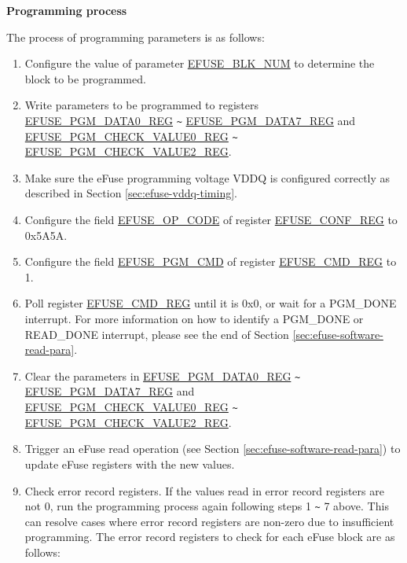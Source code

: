 \documentclass[main\_\_EN.tex]{subfiles}
\begin{document}
{\bfseries Programming process}

The process of programming parameters is as follows:

\begin{enumerate}
\item Configure the value of parameter \hyperref[fielddesc:EFUSEBLKNUM]{EFUSE\_BLK\_NUM} to determine the block to be programmed.

\item Write parameters to be programmed to registers \hyperref[regdesc:EFUSEPGMDATANREG]{EFUSE\_PGM\_DATA0\_REG} \verb+~+ \hyperref[regdesc:EFUSEPGMDATANREG]{EFUSE\_PGM\_DATA7\_REG} and  \hyperref[regdesc:EFUSEPGMCHECKVALUENREG]{EFUSE\_PGM\_CHECK\_VALUE0\_REG} \verb+~+ \hyperref[regdesc:EFUSEPGMCHECKVALUENREG]{EFUSE\_PGM\_CHECK\_VALUE2\_REG}. 

\item Make sure the eFuse programming voltage VDDQ is configured correctly as described in Section \ref{sec:efuse-vddq-timing}.

\item Configure the field \hyperref[fielddesc:EFUSEOPCODE]{EFUSE\_OP\_CODE} of register \hyperref[regdesc:EFUSECONFREG]{EFUSE\_CONF\_REG} to 0x5A5A.

\item Configure the field \hyperref[fielddesc:EFUSEPGMCMD]{EFUSE\_PGM\_CMD} of register \hyperref[regdesc:EFUSECMDREG]{EFUSE\_CMD\_REG} to 1.

\item Poll register \hyperref[regdesc:EFUSECMDREG]{EFUSE\_CMD\_REG} until it is 0x0, or wait for a PGM\_DONE interrupt. For more information on how to identify a PGM\_DONE or READ\_DONE interrupt, please see the end of Section \ref{sec:efuse-software-read-para}.

\item Clear the parameters in \hyperref[regdesc:EFUSEPGMDATANREG]{EFUSE\_PGM\_DATA0\_REG} \verb+~+ \hyperref[regdesc:EFUSEPGMDATANREG]{EFUSE\_PGM\_DATA7\_REG} and \\ \hyperref[regdesc:EFUSEPGMCHECKVALUENREG]{EFUSE\_PGM\_CHECK\_VALUE0\_REG} \verb+~+ \hyperref[regdesc:EFUSEPGMCHECKVALUENREG]{EFUSE\_PGM\_CHECK\_VALUE2\_REG}.

\item Trigger an eFuse read operation (see Section \ref{sec:efuse-software-read-para}) to update eFuse registers with the new values.
\item Check error record registers. If the values read in error record registers are not 0, run the programming process again following steps 1 \verb+~+ 7 above. This can resolve cases where error record registers are non-zero due to insufficient programming. The error record registers to check for each eFuse block are as follows:



\end{enumerate}
\end{document}

